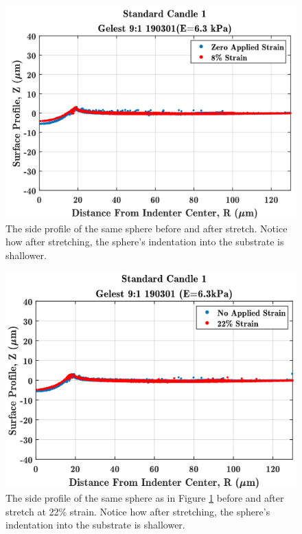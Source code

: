 \begin{figure}[h!]
	\centering
	\includegraphics[width=\linewidth]{Chapters/Figures/stretch_v_unstretched_0-88-ST1}
	\caption[Side Profile Comparison: 8\%]{The side profile of the same sphere before and after stretch. Notice how after stretching, the sphere's indentation into the substrate is shallower.}	
	\label{fig:sc1unstretchedv8ml}
\end{figure}
\begin{figure}
	\centering
	\includegraphics[width=\linewidth]{Chapters/Figures/stretch_v_unstretched_0-22-ST1}
	\caption[Side Profile Comparison: 22\%]{The side profile of the same sphere as in Figure \ref{fig:sc1unstretchedv8ml} before and after stretch at 22\% strain. Notice how after stretching, the sphere's indentation into the substrate is shallower.}
	\label{fig:stretchvunstretched0-22-st1}
\end{figure}

